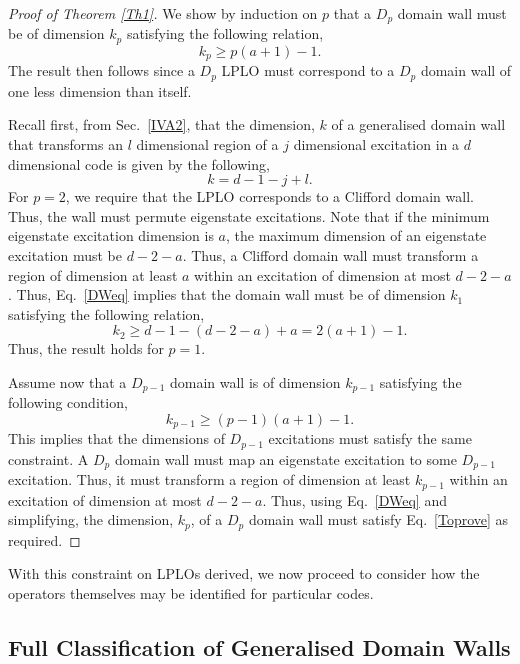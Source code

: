 \documentclass[pra,twocolumn,a4paper,nofootinbib]{revtex4-1}
\begin{document}
\begin{proof}[Proof of Theorem \ref{Th1}]
We show by induction on $p$ that a $D_p$ domain wall must be of dimension $k_p$ satisfying the following relation,
\begin{equation} \label{Toprove}
 k_p \geq p(a+1)-1.
\end{equation}
The result then follows since a $D_p$ LPLO must correspond to a $D_p$ domain wall of one less dimension than itself. 

Recall first, from Sec.~\ref{IVA2}, that the dimension, $k$ of a generalised domain wall that transforms an $l$ dimensional region of a $j$ dimensional excitation in a $d$ dimensional code is given by the following,
\begin{equation}
k=d-1-j+l \label{DWeq}.
\end{equation}
For $p=2$, we require that the LPLO corresponds to a Clifford domain wall. Thus, the wall must permute eigenstate excitations. Note that if the minimum eigenstate excitation dimension is $a$, the maximum dimension of an eigenstate excitation must be $d-2-a$. Thus, a Clifford domain wall must transform a region of dimension at least $a$ within an excitation of dimension at most $d-2-a$. Thus, Eq.~\ref{DWeq} implies that the domain wall must be of dimension $k_1$ satisfying the following relation,
\begin{equation}
k_2\geq d-1-(d-2-a)+a= 2(a+1)-1.
\end{equation}
Thus, the result holds for $p=1$.

Assume now that a $D_{p-1}$ domain wall is of dimension $k_{p-1}$ satisfying the following condition,
\begin{equation}
k_{p-1} \geq (p-1)(a+1)-1.
\end{equation}
This implies that the dimensions of $D_{p-1}$ excitations must satisfy the same constraint. A $D_p$ domain wall must map an eigenstate excitation to some $D_{p-1}$ excitation. Thus, it must transform a region of dimension at least $k_{p-1}$ within an excitation of dimension at most $d-2-a$. Thus, using Eq.~\ref{DWeq} and simplifying, the dimension, $k_p$, of a $D_p$ domain wall must satisfy Eq.~\ref{Toprove} as required.
\end{proof}
With this constraint on LPLOs derived, we now proceed to consider how the operators themselves may be identified for particular codes.

\subsection{Full Classification of Generalised Domain Walls}
\label{VB}
\end{document}
